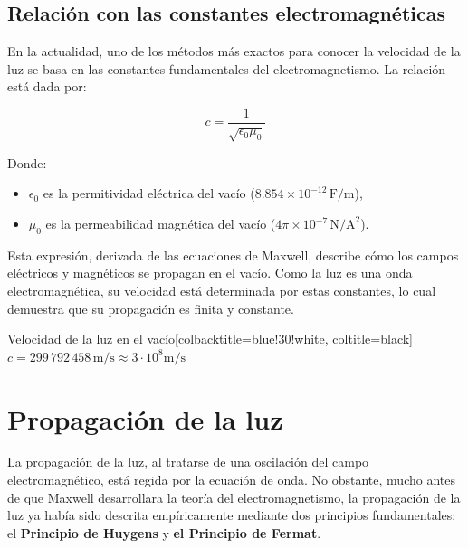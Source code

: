 \vspace{0.3cm}

\subsection*{Relación con las constantes electromagnéticas}

En la actualidad, uno de los métodos más exactos para conocer la velocidad de la luz se basa en las constantes fundamentales del electromagnetismo. La relación está dada por:

\[
c = \frac{1}{\sqrt{\epsilon_0 \mu_0}}
\]

Donde:
\begin{itemize}
	\item $\epsilon_0$ es la permitividad eléctrica del vacío ($8.854 \times 10^{-12}\, \text{F/m}$),
	\item $\mu_0$ es la permeabilidad magnética del vacío ($4\pi \times 10^{-7}\, \text{N/A}^2$).
\end{itemize}

Esta expresión, derivada de las ecuaciones de Maxwell, describe cómo los campos eléctricos y magnéticos se propagan en el vacío. Como la luz es una onda electromagnética, su velocidad está determinada por estas constantes, lo cual demuestra que su propagación es finita y constante.

\begin{mybox}[blue]{Velocidad de la luz en el vacío}[colbacktitle=blue!30!white, coltitle=black]
	$c = 299\,792\,458 \, \text{m/s} \approx 3\cdot10^8 \text{m/s}$ 
\end{mybox}

\vspace{0.3cm}


\section*{Propagación de la luz}

La propagación de la luz, al tratarse de una oscilación del campo electromagnético, está regida por la ecuación de onda. No obstante, mucho antes de que Maxwell desarrollara la teoría del electromagnetismo, la propagación de la luz ya había sido descrita empíricamente mediante dos principios fundamentales: el \textbf{Principio de Huygens} y \textbf{el Principio de Fermat}.


